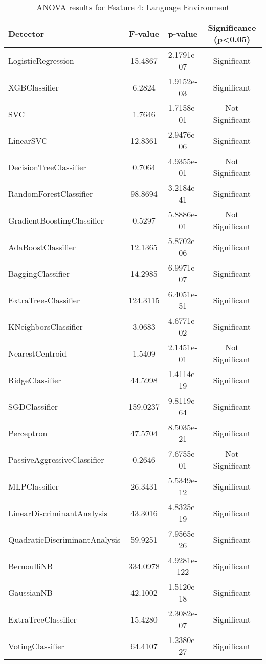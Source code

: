 \begin{table*}[htbp]
\centering
\small
\begin{tabular}{lccc}
\toprule
\textbf{Detector} & \textbf{F-value} & \textbf{p-value} & \textbf{Significance (p<0.05)} \\
\midrule
LogisticRegression             & 15.4867  & 2.1791e-07  & Significant \\
XGBClassifier                  & 6.2824   & 1.9152e-03  & Significant \\
SVC                            & 1.7646   & 1.7158e-01  & Not Significant \\
LinearSVC                      & 12.8361  & 2.9476e-06  & Significant \\
DecisionTreeClassifier         & 0.7064   & 4.9355e-01  & Not Significant \\
RandomForestClassifier         & 98.8694  & 3.2184e-41  & Significant \\
GradientBoostingClassifier     & 0.5297   & 5.8886e-01  & Not Significant \\
AdaBoostClassifier             & 12.1365  & 5.8702e-06  & Significant \\
BaggingClassifier              & 14.2985  & 6.9971e-07  & Significant \\
ExtraTreesClassifier           & 124.3115 & 6.4051e-51  & Significant \\
KNeighborsClassifier           & 3.0683   & 4.6771e-02  & Significant \\
NearestCentroid                & 1.5409   & 2.1451e-01  & Not Significant \\
RidgeClassifier                & 44.5998  & 1.4114e-19  & Significant \\
SGDClassifier                  & 159.0237 & 9.8119e-64  & Significant \\
Perceptron                     & 47.5704  & 8.5035e-21  & Significant \\
PassiveAggressiveClassifier    & 0.2646   & 7.6755e-01  & Not Significant \\
MLPClassifier                  & 26.3431  & 5.5349e-12  & Significant \\
LinearDiscriminantAnalysis     & 43.3016  & 4.8325e-19  & Significant \\
QuadraticDiscriminantAnalysis  & 59.9251  & 7.9565e-26  & Significant \\
BernoulliNB                    & 334.0978 & 4.9281e-122 & Significant \\
GaussianNB                     & 42.1002  & 1.5120e-18  & Significant \\
ExtraTreeClassifier            & 15.4280  & 2.3082e-07  & Significant \\
VotingClassifier               & 64.4107  & 1.2380e-27  & Significant \\
\bottomrule
\end{tabular}
\caption{ANOVA results for Feature 4: Language Environment}
\end{table*}
